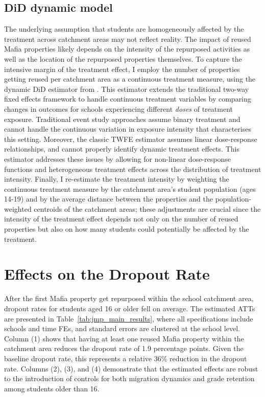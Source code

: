 \documentclass[12pt]{article}
\theoremstyle{plain}
\theoremstyle{plain}
\theoremstyle{plain}
\theoremstyle{definition}
\theoremstyle{plain}
\theoremstyle{definition}
\theoremstyle{plain}
\theoremstyle{remark}
\theoremstyle{definition}
\theoremstyle{definition}
\theoremstyle{plain}
\begin{document}
 \subsection{DiD dynamic model}
\label{sec:jmp_did_dynamic}
The underlying assumption that students are homogeneously affected by the treatment across catchment areas may not reflect reality. The impact of reused Mafia properties likely depends on the intensity of the repurposed activities as well as the location of the repurposed properties themselves. To capture the intensive margin of the treatment effect, I employ the number of properties getting reused per catchment area as a continuous treatment measure, using the dynamic DiD estimator from \citet{de_chaisemartin_two-way_2020}.  This estimator extends the traditional two-way fixed effects framework to handle continuous treatment variables by comparing changes in outcomes for schools experiencing different \emph{doses} of treatment exposure. Traditional event study approaches assume binary treatment and cannot handle the continuous variation in exposure intensity that characterises this setting. Moreover, the classic TWFE estimator assumes linear dose-response relationships,  and cannot properly identify dynamic treatment effects. This estimator addresses these issues by allowing for non-linear dose-response functions and heterogeneous treatment effects across the distribution of treatment intensity. Finally, I re-estimate the treatment intensity by weighting the continuous treatment measure by the catchment area's student population (ages 14-19) and by the average distance between the properties and the population-weighted centroids of the catchment areas; these adjustments are crucial since the intensity of the treatment effect depends not only on the number of reused properties but also on how many students could potentially be affected by the treatment.\par


\FloatBarrier
\section{Effects on the Dropout Rate}
\label{sec:jmp_results}

After the first Mafia property get repurposed within the school catchment area, dropout rates for students aged 16 or older fell on average. The estimated ATTs are presented in Table~\ref{tab:jmp_main_results}, where all specifications include schools and time FEs, and standard errors are clustered at the school level. Column (1) shows that having at least one reused Mafia property within the catchment area reduces the dropout rate of 1.9 percentage points. Given the baseline dropout rate, this represents a relative 36\% reduction in the dropout rate. Columns (2), (3), and (4) demonstrate that the estimated effects are robust to the introduction of controls for both migration dynamics  and grade retention among students older than 16.  \par 
\end{document}

